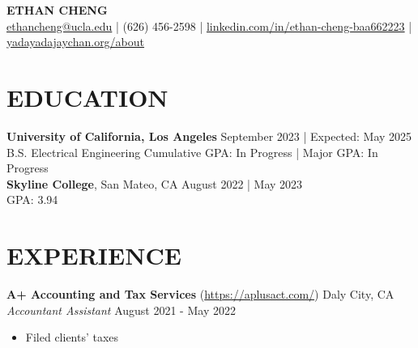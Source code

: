 \documentclass[letterpaper,9pt]{extarticle}
\begin{document}

\begin{center}
\textbf{\Large ETHAN CHENG}\\[2pt]
	\href{mailto:ethancheng@ucla.edu}{ethancheng@ucla.edu} | (626) 456-2598 | \href{https://www.linkedin.com/in/ethan-cheng-baa662223}{linkedin.com/in/ethan-cheng-baa662223} | \href{http://www.yadayadajaychan.org/about/}{yadayadajaychan.org/about}
\end{center}

\section*{EDUCATION}
\noindent
\textbf{University of California, Los Angeles} \hfill September 2023 | Expected: May 2025\\
B.S. Electrical Engineering \hfill Cumulative GPA: In Progress | Major GPA: In Progress\\ %

\noindent
\textbf{Skyline College}, San Mateo, CA \hfill August 2022 | May 2023\\
\null \hfill GPA: 3.94

\section*{EXPERIENCE}
\noindent
\textbf{A+ Accounting and Tax Services} (\url{https://aplusact.com/}) \hfill Daly City, CA\\
\textit{Accountant Assistant} \hfill August 2021 - May 2022 %
\begin{itemize}
	\item Filed clients' taxes
\end{itemize}

%
\end{document}
